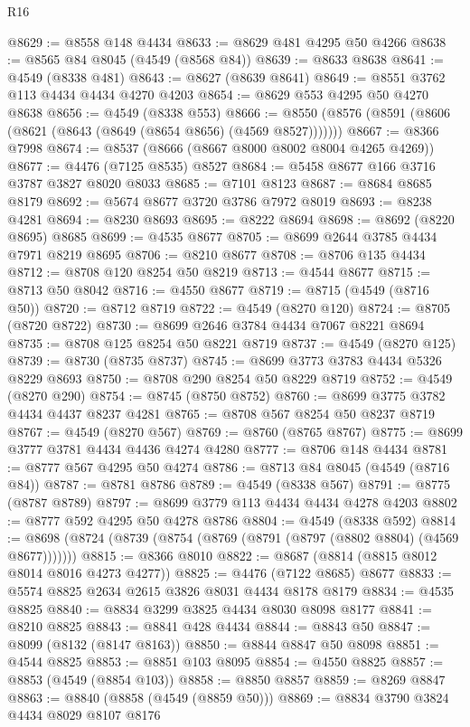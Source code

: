 \begin{lexlean}{R16}
\begin{coremodule}
@8629 := @8558 @148 @4434
@8633 := @8629 @481 @4295 @50 @4266
@8638 := @8565 @84 @8045 (@4549 (@8568 @84))
@8639 := @8633 @8638
@8641 := @4549 (@8338 @481)
@8643 := @8627 (@8639 @8641)
@8649 := @8551 @3762 @113 @4434 @4434 @4270 @4203
@8654 := @8629 @553 @4295 @50 @4270 @8638
@8656 := @4549 (@8338 @553)
@8666 := @8550 (@8576 (@8591 (@8606 (@8621 (@8643 (@8649 (@8654 @8656) (@4569 @8527)))))))
@8667 := @8366 @7998
@8674 := @8537 (@8666 (@8667 @8000 @8002 @8004 @4265 @4269))
@8677 := @4476 (@7125 @8535) @8527
@8684 := @5458 @8677 @166 @3716 @3787 @3827 @8020 @8033
@8685 := @7101 @8123
@8687 := @8684 @8685 @8179
@8692 := @5674 @8677 @3720 @3786 @7972 @8019
@8693 := @8238 @4281
@8694 := @8230 @8693
@8695 := @8222 @8694
@8698 := @8692 (@8220 @8695) @8685
@8699 := @4535 @8677
@8705 := @8699 @2644 @3785 @4434 @7971 @8219 @8695
@8706 := @8210 @8677
@8708 := @8706 @135 @4434
@8712 := @8708 @120 @8254 @50 @8219
@8713 := @4544 @8677
@8715 := @8713 @50 @8042
@8716 := @4550 @8677
@8719 := @8715 (@4549 (@8716 @50))
@8720 := @8712 @8719
@8722 := @4549 (@8270 @120)
@8724 := @8705 (@8720 @8722)
@8730 := @8699 @2646 @3784 @4434 @7067 @8221 @8694
@8735 := @8708 @125 @8254 @50 @8221 @8719
@8737 := @4549 (@8270 @125)
@8739 := @8730 (@8735 @8737)
@8745 := @8699 @3773 @3783 @4434 @5326 @8229 @8693
@8750 := @8708 @290 @8254 @50 @8229 @8719
@8752 := @4549 (@8270 @290)
@8754 := @8745 (@8750 @8752)
@8760 := @8699 @3775 @3782 @4434 @4437 @8237 @4281
@8765 := @8708 @567 @8254 @50 @8237 @8719
@8767 := @4549 (@8270 @567)
@8769 := @8760 (@8765 @8767)
@8775 := @8699 @3777 @3781 @4434 @4436 @4274 @4280
@8777 := @8706 @148 @4434
@8781 := @8777 @567 @4295 @50 @4274
@8786 := @8713 @84 @8045 (@4549 (@8716 @84))
@8787 := @8781 @8786
@8789 := @4549 (@8338 @567)
@8791 := @8775 (@8787 @8789)
@8797 := @8699 @3779 @113 @4434 @4434 @4278 @4203
@8802 := @8777 @592 @4295 @50 @4278 @8786
@8804 := @4549 (@8338 @592)
@8814 := @8698 (@8724 (@8739 (@8754 (@8769 (@8791 (@8797 (@8802 @8804) (@4569 @8677)))))))
@8815 := @8366 @8010
@8822 := @8687 (@8814 (@8815 @8012 @8014 @8016 @4273 @4277))
@8825 := @4476 (@7122 @8685) @8677
@8833 := @5574 @8825 @2634 @2615 @3826 @8031 @4434 @8178 @8179
@8834 := @4535 @8825
@8840 := @8834 @3299 @3825 @4434 @8030 @8098 @8177
@8841 := @8210 @8825
@8843 := @8841 @428 @4434
@8844 := @8843 @50
@8847 := @8099 (@8132 (@8147 @8163))
@8850 := @8844 @8847 @50 @8098
@8851 := @4544 @8825
@8853 := @8851 @103 @8095
@8854 := @4550 @8825
@8857 := @8853 (@4549 (@8854 @103))
@8858 := @8850 @8857
@8859 := @8269 @8847
@8863 := @8840 (@8858 (@4549 (@8859 @50)))
@8869 := @8834 @3790 @3824 @4434 @8029 @8107 @8176

\end{coremodule}
\end{lexlean}
